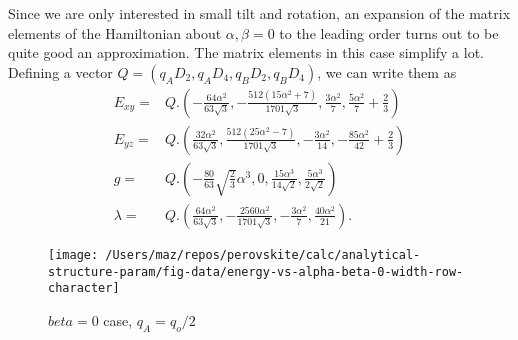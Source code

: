 \documentclass[a4paper,prb]{revtex4-1}  %
\begin{document}
Since we are only interested in small tilt and rotation,
an expansion of the matrix elements of the Hamiltonian about 
${\alpha,\beta=0}$
to the leading order turns out to be quite good an approximation.
The matrix elements in this case simplify a lot.
Defining a vector ${Q = \left( q_A D_2, q_A D_4, q_B D_2,q_B D_4  \right)}$,
 we can write them as
\begin{align}
E_{xy}=& Q.
\left(-\frac{64 \alpha ^2}{63 \sqrt{3}},-\frac{512 \left(15 \alpha ^2+7\right)}{1701 \sqrt{3}},\frac{3\alpha ^2}{7} ,\frac{5 \alpha ^2}{7}+\frac{2}{3}\right)\\
E_{yz}=& Q.
\left(\frac{32 \alpha ^2}{63 \sqrt{3}},\frac{512 \left(25 \alpha ^2-7\right)}{1701 \sqrt{3}},-\frac{3 \alpha ^2}{14},-\frac{85 \alpha ^2}{42}+\frac{2}{3}\right)\\
g=& Q.
\left(-\frac{80}{63} \sqrt{\frac{2}{3}} \alpha ^3,0,\frac{15 \alpha ^3}{14 \sqrt{2}},\frac{5 \alpha ^3}{2 \sqrt{2}}\right)\\
\lambda=& Q.
\left(\frac{64 \alpha ^2}{63 \sqrt{3}},-\frac{2560 \alpha ^2}{1701 \sqrt{3}},-\frac{3 \alpha ^2}{7},\frac{40 \alpha ^2}{21}\right).
\end{align}





\begin{figure}[htbp]
\begin{center}
\texttt{[image: /Users/maz/repos/perovskite/calc/analytical-structure-param/fig-data/energy-vs-alpha-beta-0-width-row-character]}
\caption{$beta=0$ case, $q_A=q_o/2$}
\label{fig:t2g-beta0}
\end{center}
\end{figure}
\end{document}
